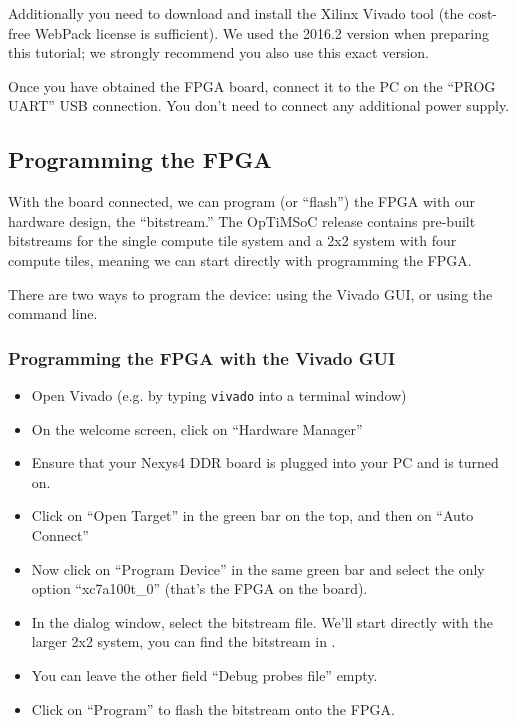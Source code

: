 Additionally you need to download and install the Xilinx Vivado tool (the cost-free WebPack license is sufficient).
We used the 2016.2 version when preparing this tutorial; we strongly recommend you also use this exact version.

Once you have obtained the FPGA board, connect it to the PC on the ``PROG UART'' USB connection.
You don't need to connect any additional power supply.

\subsection{Programming the FPGA}
With the board connected, we can program (or ``flash'') the FPGA with our hardware design, the ``bitstream.''
The OpTiMSoC release contains pre-built bitstreams for the single compute tile system and a 2x2 system with four compute tiles, meaning we can start directly with programming the FPGA.

There are two ways to program the device: using the Vivado GUI, or using the command line.

\subsubsection{Programming the FPGA with the Vivado GUI}
\begin{itemize}
 \item Open Vivado (e.g. by typing \verb|vivado| into a terminal window)
 \item On the welcome screen, click on ``Hardware Manager''
 \item Ensure that your Nexys4 DDR board is plugged into your PC and is turned on.
 \item Click on ``Open Target'' in the green bar on the top, and then on ``Auto Connect''
 \item Now click on ``Program Device'' in the same green bar and select the only option ``xc7a100t\_0'' (that's the FPGA on the board).
 \item In the dialog window, select the bitstream file. We'll start directly with the larger 2x2 system, you can find the bitstream in
   .
 \item You can leave the other field ``Debug probes file'' empty.
 \item Click on ``Program'' to flash the bitstream onto the FPGA.
\end{itemize}


